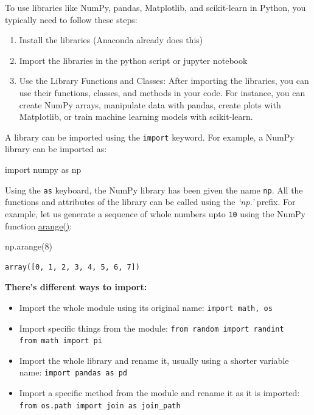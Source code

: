 \documentclass[
  letterpaper,
  DIV=11,
  numbers=noendperiod]{scrreprt}
\newenvironment{Shaded}{\begin{snugshade}}{\end{snugshade}}
\newcommand{\DecValTok}[1]{\textcolor[rgb]{0.68,0.00,0.00}{#1}}
\newcommand{\ImportTok}[1]{\textcolor[rgb]{0.00,0.46,0.62}{#1}}
\newcommand{\NormalTok}[1]{\textcolor[rgb]{0.00,0.23,0.31}{#1}}
\begin{document}
To use libraries like NumPy, pandas, Matplotlib, and scikit-learn in
Python, you typically need to follow these steps:

\begin{enumerate}
\def\labelenumi{\arabic{enumi}.}
\item
  Install the libraries (Anaconda already does this)
\item
  Import the libraries in the python script or jupyter notebook
\item
  Use the Library Functions and Classes: After importing the libraries,
  you can use their functions, classes, and methods in your code. For
  instance, you can create NumPy arrays, manipulate data with pandas,
  create plots with Matplotlib, or train machine learning models with
  scikit-learn.
\end{enumerate}

A library can be imported using the \texttt{import} keyword. For
example, a NumPy library can be imported as:

\begin{Shaded}
\begin{Highlighting}[]
\ImportTok{import}\NormalTok{ numpy }\ImportTok{as}\NormalTok{ np}
\end{Highlighting}
\end{Shaded}

Using the \texttt{as} keyboard, the NumPy library has been given the
name \texttt{np}. All the functions and attributes of the library can be
called using the \emph{`np.'} prefix. For example, let us generate a
sequence of whole numbers upto \texttt{10} using the NumPy function
\href{https://numpy.org/doc/stable/reference/generated/numpy.arange.html}{arange()}:

\begin{Shaded}
\begin{Highlighting}[]
\NormalTok{np.arange(}\DecValTok{8}\NormalTok{)}
\end{Highlighting}
\end{Shaded}

\begin{verbatim}
array([0, 1, 2, 3, 4, 5, 6, 7])
\end{verbatim}

\textbf{There's different ways to import:}

\begin{itemize}
\item
  Import the whole module using its original name:
  \texttt{import\ math,\ os}
\item
  Import specific things from the module:
  \texttt{from\ random\ import\ randint} \texttt{from\ math\ import\ pi}
\item
  Import the whole library and rename it, usually using a shorter
  variable name: \texttt{import\ pandas\ as\ pd}
\item
  Import a specific method from the module and rename it as it is
  imported: \texttt{from\ os.path\ import\ join\ as\ join\_path}
\end{itemize}
\end{document}
